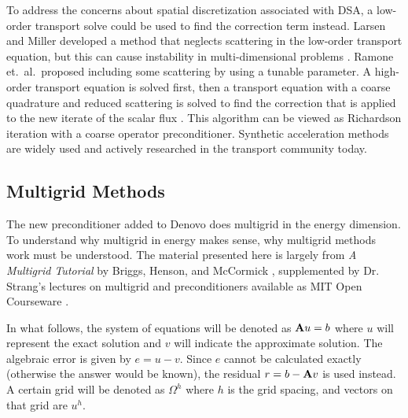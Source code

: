 To address the concerns about spatial discretization associated with DSA, a low-order transport solve could be used to find the correction term instead. Larsen and Miller developed a method that neglects scattering in the low-order transport equation, but this can cause instability in multi-dimensional problems \cite{Larsen1986}. Ramone et.\ al.\ proposed including some scattering by using a tunable parameter. A high-order transport equation is solved first, then a transport equation with a coarse quadrature and reduced scattering is solved to find the correction that is applied to the new iterate of the scalar flux \cite{Ramone1997}. This algorithm can be viewed as Richardson iteration with a coarse operator preconditioner. Synthetic acceleration methods are widely used and actively researched in the transport community today.

\subsection{Multigrid Methods}
The new preconditioner added to Denovo does multigrid in the energy dimension. To understand why multigrid in energy makes sense, why multigrid methods work must be understood. The material presented here is largely from \emph{A Multigrid Tutorial} by Briggs, Henson, and McCormick \cite{Briggs2000}, supplemented by Dr. Strang's lectures on multigrid and preconditioners available as MIT Open Courseware \cite{Strang}.

In what follows, the system of equations will be denoted as $\mathbf{A}u=b$ where $u$ will represent the exact solution and $v$ will indicate the approximate solution. The algebraic error is given by $e = u - v$. Since $e$ cannot be calculated exactly (otherwise the answer would be known), the residual $r = b - \mathbf{A}v$ is used instead. A certain grid will be denoted as $\Omega^{h}$ where $h$ is the grid spacing, and vectors on that grid are $u^{h}$. 

